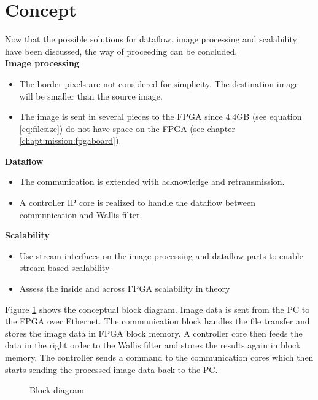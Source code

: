 %
%
\clearpage
\section{Concept} \label{chapt:mission:concept}
Now that the possible solutions for dataflow, image processing and scalability
have been discussed, the way of proceeding can be concluded.\\


\textbf{Image processing}
    \begin{itemize}
        \item The border pixels are not considered for simplicity. The destination image will be smaller than the source image.
        \item The image is sent in several pieces to the FPGA since 4.4GB 
        (see equation \ref{eq:filesize}) do not have space on the FPGA (see chapter \ref{chapt:mission:fpgaboard}).
    \end{itemize}

\textbf{Dataflow}
    \begin{itemize}
        \item The communication is extended with acknowledge and retransmission.
        \item A controller IP core is realized to handle the dataflow between
        communication and Wallis filter.
    \end{itemize}

\textbf{Scalability}
    \begin{itemize}
        \item Use stream interfaces on the image processing and dataflow parts
        to enable stream based scalability
        \item Assess the inside and across FPGA scalability in theory
    \end{itemize}


Figure \ref{fig:blockdiagram} shows the conceptual block diagram. Image data is
sent from the PC to the FPGA over Ethernet. The communication block handles the
file transfer and stores the image data in FPGA block memory. A controller core
then feeds the data in the right order to the Wallis filter and stores the
results again in block memory. The controller sends a command to the
communication cores which then starts sending the processed image data back to
the PC.

\begin{figure}[b!]
    \centering
    
    \caption{Block diagram}
    \label{fig:blockdiagram}
\end{figure}


